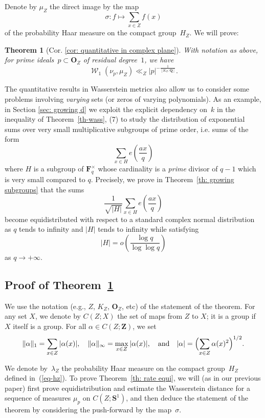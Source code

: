 \documentclass[12pt]{amsart}
\renewcommand{\mathcal}{\mathscr}
\newcommand{\Oo}{\mathbf{O}}
\newcommand{\Zz}{\mathbf{Z}}
\newcommand{\Ss}{\mathbf{S}}
\newcommand{\Qq}{\mathbf{Q}}
\newcommand{\Ff}{\mathbf{F}}
\DeclareMathOperator{\wass}{\mathcal{W}}
\theoremstyle{plain}
\newtheorem{theorem}{Theorem}[section]
\theoremstyle{remark}
\theoremstyle{definition}
\begin{document}
Denote by $\mu_Z$ the direct image by the map
\[
  \sigma \colon f \mapsto \sum_{x\in Z}f(x)
\]
of the probability Haar measure on the compact group~$H_Z$. We will
prove:

\begin{theorem}[Cor. \ref{cor: quantitative in complex plane}]
  \label{th: rate equi}
  With notation as above, for prime ideals~$p\subset \Oo_Z$ of residual
  degree~$1$, we have
  \[
    \wass_1(\nu_p,\mu_Z) \ll_Z |p|^{-\frac{1}{[K_Z: \Qq]}}.
  \]
\end{theorem}

The quantitative results in Wasserstein metrics also allow us to
consider some problems involving \emph{varying} sets (or zeros of
varying polynomials). As an example, in Section \ref{sec: growing d} we
exploit the explicit dependency on~$k$ in the inequality of
Theorem~\ref{th-wass}, (7) to study the distribution of exponential sums
over very small multiplicative subgroups of prime order, i.e. sums of
the form
\[
  \sum_{x \in H} e\left(\frac{ax}{q}\right)
\]
where $H$ is a subgroup of $\Ff_q^{\times}$ whose cardinality is a
\emph{prime} divisor of $q-1$ which is very small compared to
$q$. Precisely, we prove in Theorem~\ref{th: growing subgroups} that the
sums
\[
  \frac{1}{\sqrt{|H|}} \sum_{x \in H} e\left(\frac{ax}{q}\right)
\]
become equidistributed with respect to a standard complex normal
distribution as $q$ tends to infinity and $|H|$ tends to infinity
while satisfying
\[
  |H| = o\left( \frac{\log q}{\log\log q}
  \right)
\]
as $q\to+\infty$.

\subsection{Proof of Theorem~\ref{th: rate equi}}\label{sec: ultra-short}

We use the notation (e.g., $Z$, $K_Z$, $\Oo_Z$, etc) of the statement of
the theorem.  For any set $X$, we denote by $C(Z; X)$ the set of maps
from $Z$ to $X$; it is a group if~$X$ itself is a group. For all
$\alpha \in C(Z; \Zz)$, we set
$$
\|\alpha \|_1 = \sum_{x \in Z} |\alpha(x)|, \quad \| \alpha \|_{\infty}
= \max_{ x \in Z}|\alpha(x)|, \quad \text{and}\quad |\alpha| =
\Bigl(\sum_{x \in Z}\alpha(x)^2\Bigr)^{1/2}.
$$

We denote by~$\lambda_Z$ the probability Haar measure on the compact
group~$H_Z$ defined in~(\ref{eq-hz}). To prove Theorem~\ref{th: rate
  equi}, we will (as in our previous paper) first prove equidistribution
and estimate the Wasserstein distance for a sequence of measures $\mu_p$
on $C(Z;\Ss^1)$, and then deduce the statement of the theorem by
considering the push-forward by the map~$\sigma$. 
\end{document}
